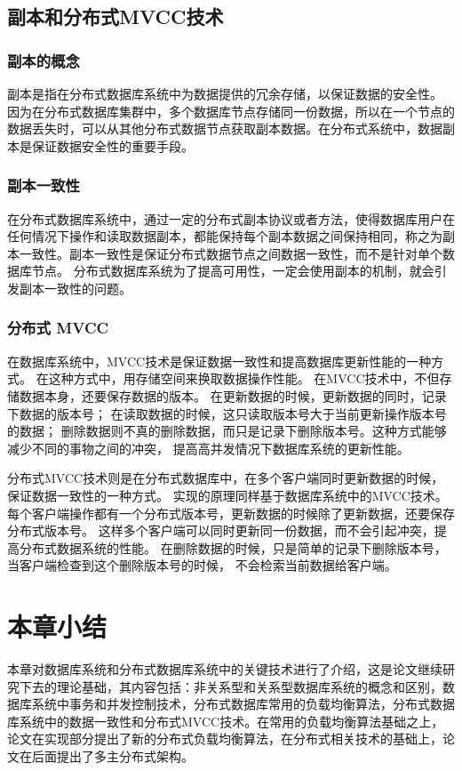 \subsection{副本和分布式MVCC技术}
\subsubsection{副本的概念}
副本是指在分布式数据库系统中为数据提供的冗余存储，以保证数据的安全性。
因为在分布式数据库集群中，多个数据库节点存储同一份数据，所以在一个节点的数据丢失时，可以从其他分布式数据节点获取副本数据。在分布式系统中，数据副本是保证数据安全性的重要手段。
\subsubsection{副本一致性}
在分布式数据库系统中，通过一定的分布式副本协议或者方法，使得数据库用户在任何情况下操作和读取数据副本，都能保持每个副本数据之间保持相同，称之为副本一致性。副本一致性是保证分布式数据节点之间数据一致性，而不是针对单个数据库节点。
分布式数据库系统为了提高可用性，一定会使用副本的机制，就会引发副本一致性的问题。
\subsubsection{分布式 MVCC}
在数据库系统中，MVCC技术是保证数据一致性和提高数据库更新性能的一种方式。
在这种方式中，用存储空间来换取数据操作性能。
在MVCC技术中，不但存储数据本身，还要保存数据的版本。
在更新数据的时候，更新数据的同时，记录下数据的版本号；
在读取数据的时候，这只读取版本号大于当前更新操作版本号的数据；
删除数据则不真的删除数据，而只是记录下删除版本号。这种方式能够减少不同的事物之间的冲突，
提高高并发情况下数据库系统的更新性能。

分布式MVCC技术则是在分布式数据库中，在多个客户端同时更新数据的时候，保证数据一致性的一种方式。
实现的原理同样基于数据库系统中的MVCC技术。
每个客户端操作都有一个分布式版本号，更新数据的时候除了更新数据，还要保存分布式版本号。
这样多个客户端可以同时更新同一份数据，而不会引起冲突，提高分布式数据系统的性能。
在删除数据的时候，只是简单的记录下删除版本号，当客户端检查到这个删除版本号的时候，
不会检索当前数据给客户端。
\section{本章小结}
本章对数据库系统和分布式数据库系统中的关键技术进行了介绍，这是论文继续研究下去的理论基础，其内容包括：非关系型和关系型数据库系统的概念和区别，数据库系统中事务和并发控制技术，分布式数据库常用的负载均衡算法，分布式数据库系统中的数据一致性和分布式MVCC技术。在常用的负载均衡算法基础之上，论文在实现部分提出了新的分布式负载均衡算法，在分布式相关技术的基础上，论文在后面提出了多主分布式架构。